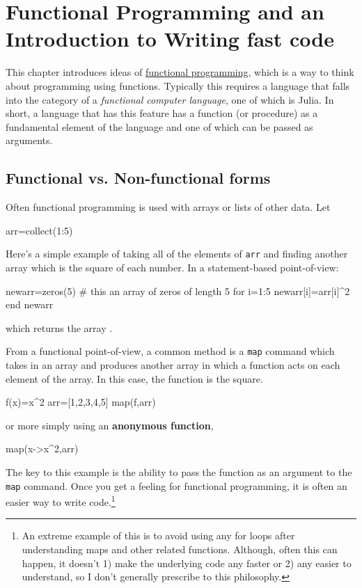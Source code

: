 %
\hypertarget{ch:functional-programming}{%
\chapter{Functional Programming and an Introduction to
Writing fast
code}\label{ch:functional-programming}}

This chapter introduces ideas of
\href{https://en.wikipedia.org/wiki/Functional_programming}{functional
programming}, which is a way to think about programming using functions.
Typically this requires a language that falls into the category of a
\emph{functional computer language}, one of which is Julia. In short, a
language that has this feature has a function (or procedure) as a
fundamental element of the language and one of which can be passed as
arguments.

\section{Functional vs. Non-functional forms}

Often functional programming is used with arrays or lists of other data.  Let 
\begin{jlblock}[fp]
arr=collect(1:5)
\end{jlblock}

Here's a simple example of taking all of the elements of \texttt{arr} and finding another array which is the square of each number. In a statement-based point-of-view:

\begin{jlblock}[fp]
newarr=zeros(5)  # this an array of zeros of length 5
for i=1:5
  newarr[i]=arr[i]^2
end
newarr
\end{jlblock}
%
which returns the array  \printpythontex[verb].

From a functional point-of-view, a common method is a \texttt{map} command which takes in an array and produces another array in which a function acts on each element of the array. In this case, the function is the square.
%
\begin{jlblock}[fp]
f(x)=x^2
arr=[1,2,3,4,5]
map(f,arr)
\end{jlblock}
%
or more simply using an \textbf{anonymous function},
%
\begin{jlblock}[fp]
map(x->x^2,arr)
\end{jlblock}

The key to this example is the ability to pass the function as an argument to the \texttt{map} command. Once you get a feeling for functional programming, it is often an easier way to write code.\footnote{An extreme example of this is to avoid using any for loops after understanding maps and other related functions.  Although, often this can happen, it doesn't 1) make the underlying code any faster or 2) any easier to understand, so I don't generally prescribe to this philosophy.}

